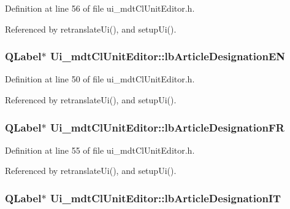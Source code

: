 Definition at line 56 of file ui\-\_\-mdt\-Cl\-Unit\-Editor.\-h.



Referenced by retranslate\-Ui(), and setup\-Ui().

\hypertarget{class_ui__mdt_cl_unit_editor_a80204efc140cbcebdc8788e1519476de}{
\subsubsection[{lb\-Article\-Designation\-E\-N}]{\setlength{\rightskip}{0pt plus 5cm}Q\-Label$\ast$ Ui\-\_\-mdt\-Cl\-Unit\-Editor\-::lb\-Article\-Designation\-E\-N}}\label{class_ui__mdt_cl_unit_editor_a80204efc140cbcebdc8788e1519476de}


Definition at line 50 of file ui\-\_\-mdt\-Cl\-Unit\-Editor.\-h.



Referenced by retranslate\-Ui(), and setup\-Ui().

\hypertarget{class_ui__mdt_cl_unit_editor_acbfb23e58edb3bff32479eb8274ef514}{
\subsubsection[{lb\-Article\-Designation\-F\-R}]{\setlength{\rightskip}{0pt plus 5cm}Q\-Label$\ast$ Ui\-\_\-mdt\-Cl\-Unit\-Editor\-::lb\-Article\-Designation\-F\-R}}\label{class_ui__mdt_cl_unit_editor_acbfb23e58edb3bff32479eb8274ef514}


Definition at line 55 of file ui\-\_\-mdt\-Cl\-Unit\-Editor.\-h.



Referenced by retranslate\-Ui(), and setup\-Ui().

\hypertarget{class_ui__mdt_cl_unit_editor_a6540ea8b45fe364c657906dc1df581b4}{
\subsubsection[{lb\-Article\-Designation\-I\-T}]{\setlength{\rightskip}{0pt plus 5cm}Q\-Label$\ast$ Ui\-\_\-mdt\-Cl\-Unit\-Editor\-::lb\-Article\-Designation\-I\-T}}\label{class_ui__mdt_cl_unit_editor_a6540ea8b45fe364c657906dc1df581b4}


